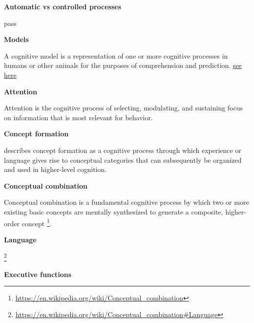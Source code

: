 \documentclass{book}
\newcommand{\seehere}[1]{\href{#1}{see here}}
\providecommand{\ProjectDeepHeading}[2]{%
    \par\medskip\noindent\textbf{#2}\par\smallskip
}
\providecommand{\seehere}[1]{\href{#1}{see here}}
\providecommand{\seeherefooter}[1]{\footnote{\url{#1}}}
\begin{document}

\ProjectDeepHeading{5}{Automatic vs controlled processes}
    pass

\ProjectDeepHeading{3}{Models}


A cognitive model is a representation of one or more cognitive processes in humans or other animals for the purposes of comprehension and prediction.
    \seehere{https://en.wikipedia.org/wiki/Cognitive_model}

\ProjectDeepHeading{4}{Attention}


\cite{chun-2011-a-taxonomy-of-external-and-internal-attention}
   Attention is the cognitive process of selecting, modulating, and sustaining focus on information that is most relevant for behavior.

\ProjectDeepHeading{4}{Concept formation}


\cite{sloutsky-2019-categories-concepts-and-conceptual-development}
describes concept formation as a cognitive process through which experience or language gives rise to conceptual categories that can subsequently be organized and used in higher-level cognition.

\ProjectDeepHeading{4}{Conceptual combination}


Conceptual combination is a fundamental cognitive process by which two or more existing basic concepts are mentally synthesized to generate a composite, higher-order concept \seeherefooter{https://en.wikipedia.org/wiki/Conceptual_combination}.

    \ProjectDeepHeading{7}{Language}
    \seeherefooter{https://en.wikipedia.org/wiki/Conceptual_combination\#Language}

\ProjectDeepHeading{4}{Executive functions}

\end{document}

